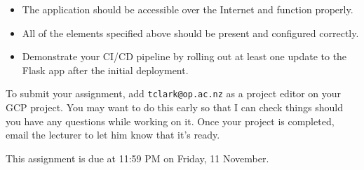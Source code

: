\documentclass{article}
\begin{document}
  \begin{itemize} 
    \item The application should be accessible over the Internet and function properly.
    \item All of the elements specified above should be present and configured correctly.
    \item Demonstrate your CI/CD pipeline by rolling out at least one update to the Flask app after the initial deployment.
  \end{itemize}   

To submit your assignment, add \texttt{tclark@op.ac.nz} as a project editor on your GCP project. You may want to do this early so that I can check things should you have any questions while working on it. Once your project is completed, email the lecturer to let him know that it's ready.

This assignment is due at 11:59 PM on Friday, 11 November.
\end{document}
